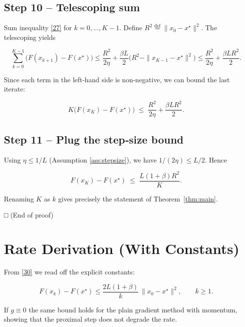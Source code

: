 \documentclass[11pt]{article}
\begin{document}
\subsection*{Step 10 – Telescoping sum}
Sum inequality \eqref{27} for $k=0,\dots, K-1$.  Define $R^{2}\stackrel{\mathrm{def}}{=}\|x_{0}-x^{\star}\|^{2}$.  The telescoping yields

\[
\sum_{k=0}^{K-1}\bigl(F(x_{k+1})-F(x^{\star})\bigr)
\le
\frac{R^{2}}{2\eta}
+\frac{\beta L}{2}\bigl(R^{2}-\|x_{K-1}-x^{\star}\|^{2}\bigr)
\le
\frac{R^{2}}{2\eta}
+\frac{\beta L R^{2}}{2}.
\tag{28}
\]

Since each term in the left‑hand side is non‑negative, we can bound the last iterate:

\[
K\bigl(F(x_{K})-F(x^{\star})\bigr)
\;\le\;
\frac{R^{2}}{2\eta}
+\frac{\beta L R^{2}}{2}.
\tag{29}
\]

\subsection*{Step 11 – Plug the step‑size bound}
Using $\eta\le 1/L$ (Assumption \ref{ass:stepsize}), we have $1/(2\eta)\le L/2$.  Hence

\[
F(x_{K})-F(x^{\star})
\;\le\;
\frac{L(1+\beta)R^{2}}{K}.
\tag{30}
\]

Renaming $K$ as $k$ gives precisely the statement of Theorem~\ref{thm:main}.

\begin{flushright}
\textbf{□}  (End of proof)
\end{flushright}

\section*{Rate Derivation (With Constants)}
From \eqref{30} we read off the explicit constants:

\[
\boxed{
\displaystyle
F(x_{k})-F(x^{\star})
\le
\frac{2L(1+\beta)}{k}\,\|x_{0}-x^{\star}\|^{2},
\qquad k\ge 1.
}
\]

If $g\equiv 0$ the same bound holds for the plain gradient method with momentum, showing that the proximal step does not degrade the rate.

\end{document}
